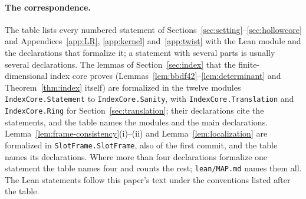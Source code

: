 \paragraph{The correspondence.} The table lists every numbered statement of Sections~\ref{sec:setting}--\ref{sec:hollowcore} and
Appendices~\ref{app:LR}, \ref{app:kernel} and~\ref{app:twist} with the Lean module and the declarations that formalize it; a statement with several parts is
usually several declarations. The lemmas of Section~\ref{sec:index} that the finite-dimensional index core proves
(Lemmas~\ref{lem:bbdf42}--\ref{lem:determinant} and Theorem~\ref{thm:index} itself) are formalized in the twelve modules
\texttt{IndexCore.Statement} to \texttt{IndexCore.Sanity}, with \texttt{IndexCore.Translation} and \texttt{IndexCore.Ring} for
Section~\ref{sec:translation}; their declarations cite the statements, and the table names the modules and the main
declarations. Lemma~\ref{lem:frame-consistency}(i)--(ii)
and Lemma~\ref{lem:localization} are formalized in \texttt{SlotFrame.SlotFrame}, also of the first commit, and the table names its
declarations. Where more than four declarations formalize one statement the table
names four and counts the rest; \texttt{lean/MAP.md} names them all. The Lean statements follow this paper's text under the
conventions listed after the table.



